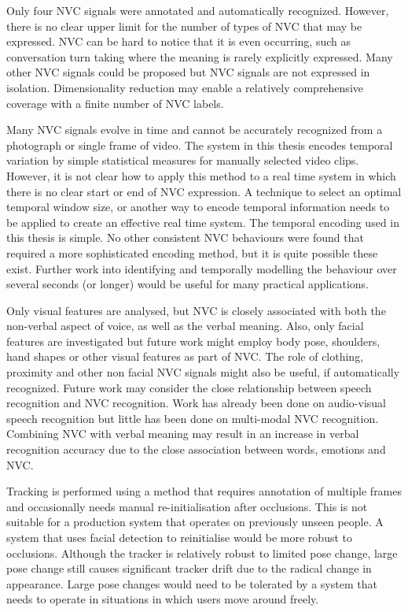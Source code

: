 Only four \ac{NVC} signals were annotated and automatically recognized. However, there is no clear upper limit for the number of types of \ac{NVC} that may be expressed. \ac{NVC} can be hard to notice that it is even occurring, such as conversation turn taking where the meaning is rarely explicitly expressed. Many other \ac{NVC} signals could be proposed but \ac{NVC} signals are not expressed in isolation. Dimensionality reduction may enable a relatively comprehensive coverage with a finite number of \ac{NVC} labels.

Many \ac{NVC} signals evolve in time and cannot be accurately recognized from a photograph or single frame of video. The system in this thesis encodes temporal variation by simple statistical measures for manually selected video clips. However, it is not clear how to apply this method to a real time system in which there is no clear start or end of \ac{NVC} expression. A technique to select an optimal temporal window size, or another way to encode temporal information needs to be applied to create an effective real time system. The temporal encoding used in this thesis is simple. %
No other consistent \ac{NVC} behaviours were found that required a more sophisticated encoding method, but it is quite possible these exist. Further work into identifying and temporally modelling the behaviour over several seconds (or longer) would be useful for many practical applications.

Only visual features are analysed, but \ac{NVC} is closely associated with both the non-verbal aspect of voice, as well as the verbal meaning. Also, only facial features are investigated but future work might employ body pose, shoulders, hand shapes or other visual features as part of \ac{NVC}. The role of clothing, proximity and other non facial \ac{NVC} signals might also be useful, if automatically recognized. Future work may consider the close relationship between speech recognition and \ac{NVC} recognition. Work has already been done on audio-visual speech recognition but little has been done on multi-modal \ac{NVC} recognition. Combining \ac{NVC} with verbal meaning may result in an increase in verbal recognition accuracy due to the close association between words, emotions and \ac{NVC}.

Tracking is performed using a method that requires annotation of multiple frames and occasionally needs manual re-initialisation after occlusions. This is not suitable for a production system that operates on previously unseen people. A system that uses facial detection to reinitialise would be more robust to occlusions. Although the tracker is relatively robust to limited pose change, large pose change still causes significant tracker drift due to the radical change in appearance. Large pose changes would need to be tolerated by a system that needs to operate in situations in which users move around freely.

